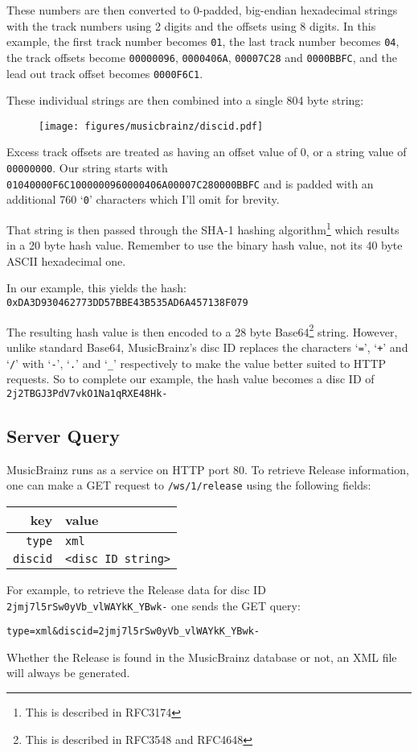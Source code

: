 These numbers are then converted to 0-padded, big-endian hexadecimal strings
with the track numbers using 2 digits and the offsets using 8 digits.
In this example, the first track number becomes \texttt{01},
the last track number becomes \texttt{04},
the track offsets become \texttt{00000096}, \texttt{0000406A},
\texttt{00007C28} and \texttt{0000BBFC},
and the lead out track offset becomes \texttt{0000F6C1}.

These individual strings are then combined into a single 804 byte string:
\begin{figure}[h]
\texttt{[image: figures/musicbrainz/discid.pdf]}
\end{figure}

Excess track offsets are treated as having an offset value of 0,
or a string value of \texttt{00000000}.
Our string starts with \texttt{01040000F6C1000000960000406A00007C280000BBFC}
and is padded with an additional 760 `\texttt{0}' characters
which I'll omit for brevity.

That string is then passed through the SHA-1 hashing algorithm\footnote{This is described in RFC3174}
which results in a 20 byte hash value.
Remember to use the binary hash value, not its 40 byte ASCII hexadecimal one.

In our example, this yields the hash:
\texttt{0xDA3D930462773DD57BBE43B535AD6A457138F079}

The resulting hash value is then encoded to a 28 byte Base64\footnote{This is described in RFC3548 and RFC4648} string.
However, unlike standard Base64, MusicBrainz's disc ID replaces the
characters `\texttt{=}', `\texttt{+}' and `\texttt{/}' with `\texttt{-}', `\texttt{.}' and `\texttt{\_}' respectively to
make the value better suited to HTTP requests.
So to complete our example, the hash value becomes a disc ID of
\texttt{2j2TBGJ3PdV7vkO1Na1qRXE48Hk-}

\clearpage

\subsection{Server Query}
MusicBrainz runs as a service on HTTP port 80.
To retrieve Release information, one can make a GET request to
\texttt{/ws/1/release} using the following fields:
\begin{table}[h]
\begin{tabular}{|r|l|}
\hline
key & value \\
\hline
\texttt{type} & \texttt{xml} \\
\texttt{discid} & \texttt{<disc ID string>} \\
\hline
\end{tabular}
\end{table}
\par
\noindent
For example, to retrieve the Release data for disc ID
\texttt{2jmj7l5rSw0yVb\_vlWAYkK\_YBwk-} one sends the GET query:
\begin{Verbatim}[frame=single]
type=xml&discid=2jmj7l5rSw0yVb_vlWAYkK_YBwk-
\end{Verbatim}
Whether the Release is found in the MusicBrainz database or not,
an XML file will always be generated.

